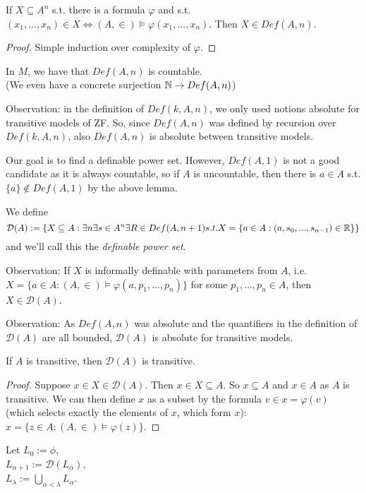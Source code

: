 \documentclass[a4paper]{article}
\begin{document}
\begin{lemma}
If $X \subseteq A^n$ s.t. there is a formula $\varphi$ and s.t. $(x_1,...,x_n) \in X \iff (A,\in) \vDash \varphi(x_1,...,x_n)$. Then $X \in Def(A,n)$.
\begin{proof}
Simple induction over complexity of $\varphi$.
\end{proof}
\end{lemma}

\begin{lemma}
In $M$, we have that $Def(A,n)$ is countable.\\
(We even have a concrete surjection $\mathbb{N} \to Def(A,n)$)
\end{lemma}
Observation: in the definition of $Def(k,A,n)$, we only used notions absolute for transitive models of ZF. So, since $Def(A,n)$ was defined by recursion over $Def(k,A,n)$, also $Def(A,n)$ is absolute between transitive models.

Our goal is to find a definable power set. However, $Def(A,1)$ is not a good candidate as it is always countable, so if $A$ is uncountable, then there is $a \in A$ s.t. $\{a\} \not\in Def(A,1)$ by the above lemma.

We define
\[
\mathcal{D}(A) := \{X \subseteq A: \exists n \exists s \in A^n \exists R \in Def(A,n+1) s.t. X = \{a \in A: (a,s_0,...,s_{n-1}) \in \mathbb{R}\}\}
\]
and we'll call this the \emph{definable power set}.

Observation: If $X$ is informally definable with parameters from $A$, i.e. $X = \{ a \in A: (A,\in) \vDash \varphi(a,p_1,...,p_n) \}$ for some $p_1,...,p_n \in A$, then $X \in \mathcal{D}(A)$.

Observation: As $Def(A,n)$ was absolute and the quantifiers in the definition of $\mathcal{D}(A)$ are all bounded, $\mathcal{D}(A)$ is absolute for transitive models.

\begin{prop}
If $A$ is transitive, then $\mathcal{D}(A)$ is transitive.
\begin{proof}
Suppose $x \in X \in \mathcal{D}(A)$. Then $x \in X \subseteq A$. So $x \subseteq A$ and $x \in A$ as $A$ is transitive. We can then define $x$ as a subset by the formula $v \in x = \varphi(v)$ (which selects exactly the elements of $x$, which form $x$): $x = \{z \in A: (A,\in) \vDash \varphi(z)\}$.
\end{proof}
\end{prop}

Let $L_0:=\phi$,\\
$L_{\alpha+1}:= \mathcal{D}(L_\alpha)$,\\
$L_{\lambda} := \bigcup_{\alpha<\lambda} L_\alpha$.
\end{document}
